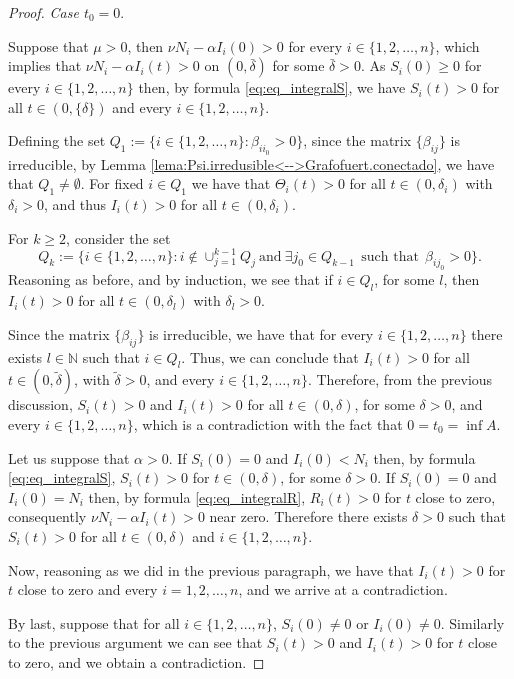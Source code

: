 \documentclass[a4paper,10pt]{article}
\theoremstyle{remark}
\begin{document}
\begin{proof}
\emph{Case $t_0=0.$}

Suppose that $\mu>0$, then $\nu N_i-\alpha I_i(0)>0$ for every $i\in\{1,2,\ldots,n\}$, which implies that $\nu N_i-\alpha I_i(t)>0$ on $(0,\bar{\delta})$ for some $\bar{\delta}>0$. As $S_i(0)\geq 0$ for every $i\in\{1,2,\ldots,n\}$ then, by formula \eqref{eq:eq_integralS}, we have  $S_i(t)>0$ for all $t\in (0,\{\delta\})$ and every $i\in\{1,2,\ldots,n\}$.  

Defining the set $Q_1:=\{i\in\{1,2,\ldots,n\}:\beta_{i i_0}>0\}$, since the matrix  $\{\beta_{ij}\}$ is  irreducible, by Lemma \ref{lema:Psi.irredusible<-->Grafofuert.conectado}, we have that $Q_1\neq \emptyset$. For fixed $i\in Q_1$ we have that $\Theta_i(t)>0$ for all $t\in (0,\delta_i)$ with $\delta_i>0$, and thus $I_i(t)>0$ for all $t\in (0,\delta_i)$.  

For $k\geq 2$, consider the set $$Q_k:=\{i\in \{1,2,\ldots,n\}: i\notin \cup_{j=1}^{k-1}Q_j\ \text{and}\ \exists j_0\in Q_{k-1}\ \ \text{such that}\ \ \beta_{ij_0}>0 \}.$$ Reasoning as before, and by induction, we  see that if  $i\in Q_l$, for some $l$, then $I_i(t)>0$  for all $t\in (0,\delta_l)$ with $\delta_l>0$. 

Since the matrix $\{\beta_{ij}\}$ is irreducible, we have that for every $i\in \{1,2,\ldots,n\}$ there exists $l\in\mathbb{N}$ such that $i\in Q_l$. Thus, we can conclude that $I_i(t)>0$ for all $t\in (0,\tilde{\delta})$, with $\tilde{\delta}>0$, and every $i\in \{1,2,\ldots,n\}$. Therefore, from the previous discussion,   $S_i(t)>0$ and $I_i(t)>0$ for all $t\in (0,\delta)$, for some $\delta>0$, and every $i\in \{1,2,\ldots,n\}$, which is a contradiction with the fact that $0=t_0=\inf A$.

Let us suppose that $\alpha>0$. If $S_i(0)=0$ and $I_i(0)<N_i$ then, by formula \eqref{eq:eq_integralS}, $S_i(t)>0$ for $t\in (0,\delta)$, for some $\delta>0$.  If  $S_{i}(0)=0$ and $I_{i}(0)=N_i$ then, by formula \eqref{eq:eq_integralR},  $R_i(t)>0$ for $t$ close to zero, consequently $\nu N_i-\alpha I_i(t)>0$ near  zero.  Therefore there exists $\delta>0$ such that $S_i(t)>0$ for all $t\in (0,\delta)$ and $i\in\{1,2,\ldots,n\}$. 

Now, reasoning as we did in the previous paragraph, we have that $I_i(t)>0$ for $t$ close to zero and every $i=1,2,\ldots,n$, and we  arrive at a contradiction.  

By last, suppose that for all $i\in\{1,2,\ldots,n\}$,  $S_i(0)\neq 0$ or $I_i(0)\neq 0$. Similarly to the previous argument we can see that $S_i(t)>0$ and $I_i(t)>0$ for $t$ close to zero, and we  obtain a contradiction.
 

\end{proof}
\end{document}
